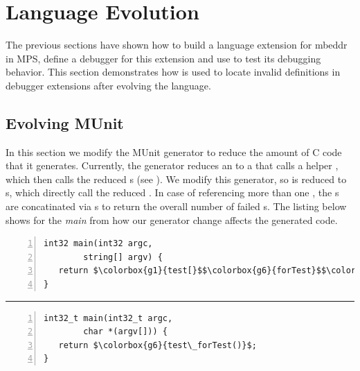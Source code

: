 \section{Language Evolution}

The previous sections have shown how to build a language extension for mbeddr in
\ac{MPS}, define a debugger for this extension and use  to test its
debugging behavior.
This section demonstrates how  is used to locate invalid definitions
in debugger extensions after evolving the language.

\subsection{Evolving MUnit}

In this section we modify the MUnit generator to reduce the amount of C
code that it generates. Currently, the generator reduces an
 to a  that calls a helper
, which then calls the reduced s (see ).
We modify this generator, so  is reduced to
s, which directly call the reduced . In case of
referencing more than one , the s are concatinated
via s to return the overall number of failed
s. The listing below shows for the \emph{main} 
from  how our generator change affects the generated code. 

\vspace{-2mm}
\noindent 
\hspace{1.2mm}
\begin{minipage}[t]{120pt} 
\begin{lstlisting}[language=reducedMbeddr,numbers=left]
int32 main(int32 argc,
		string[] argv) {
   return $\colorbox{g1}{test[}$$\colorbox{g6}{forTest}$$\colorbox{g1}{]}$;
}
\end{lstlisting}
\end{minipage} 
\rule[-10ex]{0.1ex}{4.0em}
\hspace{0.75mm}
\begin{minipage}[t]{125pt} 
\begin{lstlisting}[language=reducedMbeddr,numbers=left]
int32_t main(int32_t argc,
		char *(argv[])) {
   return $\colorbox{g6}{test\_forTest()}$;
}  
\end{lstlisting}
\end{minipage} 
\vspace{-4mm}
\begin{lstlisting}[caption={Parts of the example program
from \lst{lst:generatedUT} using \emph{MUnit} on the left and the C code
generated form it with our modified generator},
language=mbeddr,label=lst:newGeneratedUT]
\end{lstlisting}



